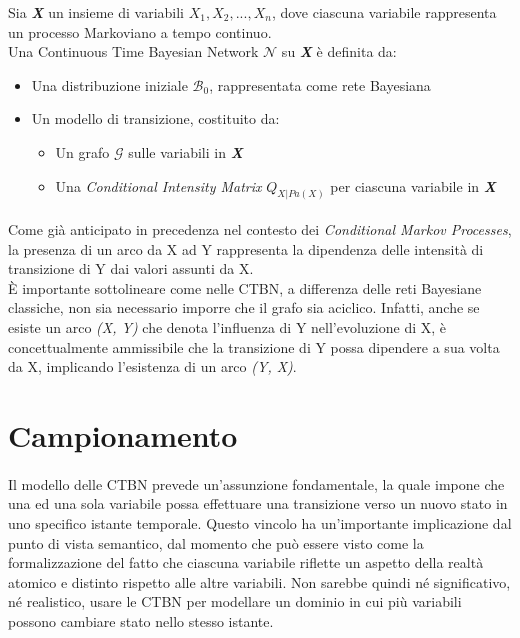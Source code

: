   \begin{definition} \cite{nodelman-2002}
    Sia \textit{\textbf{X}} un insieme di variabili $X_1, X_2, ..., X_n$, dove ciascuna variabile rappresenta
    un processo Markoviano a tempo continuo.\\
    Una Continuous Time Bayesian Network $\mathcal{N}$ su \textit{\textbf{X}} è definita da:
    \begin{itemize}
      \item Una distribuzione iniziale $\mathcal{B}_0$, rappresentata come rete Bayesiana
      \item Un modello di transizione, costituito da:
      \begin{itemize}
        \item Un grafo $\mathcal{G}$ sulle variabili in \textit{\textbf{X}}
        \item Una \textit{Conditional Intensity Matrix} $Q_{X|Pa(X)}$ per ciascuna variabile in \textit{\textbf{X}}
      \end{itemize}
    \end{itemize}
  \end{definition}

  \paragraph{}
  Come già anticipato in precedenza nel contesto dei \textit{Conditional Markov Processes},
  la presenza di un arco da X ad Y rappresenta la dipendenza delle intensità di transizione
  di Y dai valori assunti da X.\\
  È importante sottolineare come nelle CTBN, a differenza delle reti Bayesiane classiche,
  non sia necessario imporre che il grafo sia aciclico.
  Infatti, anche se esiste un arco \textit{(X, Y)} che denota l'influenza di Y nell'evoluzione di X,
  è concettualmente ammissibile che la transizione di Y possa dipendere a sua volta da X,
  implicando l'esistenza di un arco \textit{(Y, X)}.  

  \section{Campionamento}
  \paragraph{}
  Il modello delle CTBN prevede un'assunzione fondamentale, la quale impone che una ed una sola variabile 
  possa effettuare una transizione verso un nuovo stato in uno specifico istante temporale. 
  Questo vincolo ha un'importante implicazione dal punto di vista semantico, dal momento che può essere visto come 
  la formalizzazione del fatto che ciascuna variabile riflette un aspetto della realtà atomico e distinto rispetto alle altre variabili.
  Non sarebbe quindi né significativo, né realistico, usare le CTBN per modellare un dominio in cui più variabili possono cambiare stato nello stesso istante.
  
